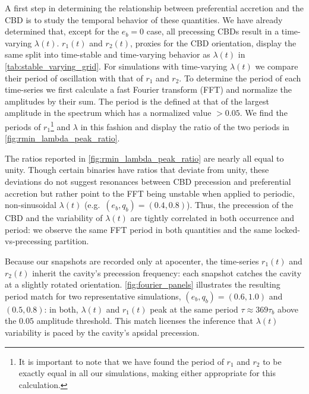 \documentclass[fleqn,usenatbib]{mnras}
\begin{document}
A first step in determining the relationship between preferential accretion and the CBD is to study the temporal behavior of these quantities. We have already determined that, except for the $e_b = 0$ case, all precessing CBDs result in a time-varying $\lambda(t)$. $r_{1}(t)$ and $r_{2}(t)$, proxies for the CBD orientation, display the same split into time-stable and time-varying behavior as $\lambda(t)$ in \autoref{tab:stable_varying_grid}. For simulations with time-varying $\lambda(t)$ we compare their period of oscillation with that of $r_{1}$ and $r_{2}$. To determine the period of each time-series we first calculate a fast Fourier transform (FFT) and normalize the amplitudes by their sum. The period is the defined at that of the largest amplitude in the spectrum which has a normalized value $>0.05$. We find the periods of $r_1$\footnote{It is important to note that we have found the period of $r_1$ and $r_2$ to be exactly equal in all our simulations, making either appropriate for this calculation.} and $\lambda$ in this fashion and display the ratio of the two periods in \autoref{fig:rmin_lambda_peak_ratio}.

The ratios reported in \autoref{fig:rmin_lambda_peak_ratio} are nearly all equal to unity. Though certain binaries have ratios that deviate from unity, these deviations do not suggest resonances between CBD precession and preferential accretion but rather point to the FFT being unstable when applied to periodic, non-sinusoidal $\lambda(t)$ (e.g.\ $(e_b, q_b) = (0.4, 0.8)$). Thus, the precession of the CBD and the variability of $\lambda(t)$ are tightly correlated in both occurrence and period: we observe the same FFT period in both quantities and the same locked-vs-precessing partition.

Because our snapshots are recorded only at apocenter, the time-series $r_1(t)$ and $r_2(t)$ inherit the cavity's precession frequency: each snapshot catches the cavity at a slightly rotated orientation. \autoref{fig:fourier_panels} illustrates the resulting period match for two representative simulations, $(e_b, q_b) = (0.6, 1.0)$ and $(0.5, 0.8)$: in both, $\lambda(t)$ and $r_1(t)$ peak at the same period $\tau \approx 369 \tau_b$ above the $0.05$ amplitude threshold. This match licenses the inference that $\lambda(t)$ variability is paced by the cavity's apsidal precession.
\end{document}
